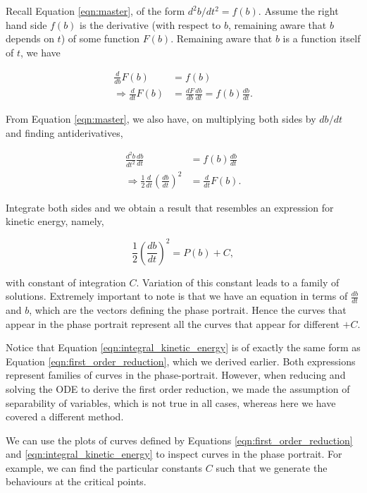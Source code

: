 \documentclass{article}
\begin{document}
Recall Equation \ref{eqn:master}, of the form $d^2b/dt^2 = f(b)$.
Assume the right hand side $f(b)$ is the derivative (with respect to $b$, remaining aware that $b$ depends on $t$) of some function $F(b)$.
Remaining aware that $b$ is a function itself of $t$, we have

\begin{align}
    \frac{d}{db}F(b) &= f(b) \\
    \Rightarrow \frac{d}{dt}F(b) &= \frac{dF}{db}\frac{db}{dt} = f(b)\frac{db}{dt}.
\end{align}

From Equation \ref{eqn:master}, we also have, on multiplying both sides by $db/dt$ and finding antiderivatives,

\begin{align}
    \frac{d^2b}{dt^2} \frac{db}{dt} &= f(b) \frac{db}{dt} \\
    \Rightarrow \frac{1}{2}\frac{d}{dt}\left( \frac{db}{dt} \right)^2 &= \frac{d}{dt}F(b).
\end{align}

Integrate both sides and we obtain a result that resembles an expression for kinetic energy, namely,

\begin{equation}
    \frac{1}{2}\left(\frac{db}{dt}\right)^2 = P(b) + C,
    \label{eqn:integral_kinetic_energy}
\end{equation}

with constant of integration $C$. Variation of this constant leads to a family of solutions.
Extremely important to note is that we have an equation in terms of $\frac{db}{dt}$ and $b$, which are the vectors defining the phase portrait.
Hence the curves that appear in the phase portrait represent all the curves that appear for different $+C$.


Notice that Equation \ref{eqn:integral_kinetic_energy} is of exactly the same form as Equation \ref{eqn:first_order_reduction},
which we derived earlier.
Both expressions represent families of curves in the phase-portrait.
However, when reducing and solving the ODE to derive the first order reduction, we made the assumption of separability of variables,
which is not true in all cases,
whereas here we have covered a different method.

We can use the plots of curves defined by Equations \ref{eqn:first_order_reduction} and \ref{eqn:integral_kinetic_energy} to inspect curves in the phase portrait.
For example, we can find the particular constants $C$ such that we generate the behaviours at the critical points.
\end{document}
